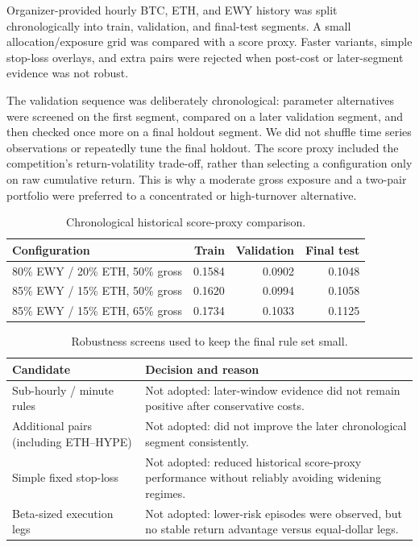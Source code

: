 \documentclass[a4paper,9pt]{article}
\begin{document}
Organizer-provided hourly BTC, ETH, and EWY history was split chronologically
into train, validation, and final-test segments. A small allocation/exposure
grid was compared with a score proxy. Faster variants, simple stop-loss
overlays, and extra pairs were rejected when post-cost or later-segment evidence
was not robust.

The validation sequence was deliberately chronological: parameter alternatives
were screened on the first segment, compared on a later validation segment, and
then checked once more on a final holdout segment. We did not shuffle time
series observations or repeatedly tune the final holdout. The score proxy
included the competition's return-volatility trade-off, rather than selecting a
configuration only on raw cumulative return. This is why a moderate gross
exposure and a two-pair portfolio were preferred to a concentrated or
high-turnover alternative.

\begin{table}[h]\centering\small
\caption{Chronological historical score-proxy comparison.}
\label{tab:allocation}
\begin{tabular}{lrrr}\toprule
Configuration & Train & Validation & Final test\\ \midrule
80\% EWY / 20\% ETH, 50\% gross & 0.1584 & 0.0902 & 0.1048\\
85\% EWY / 15\% ETH, 50\% gross & 0.1620 & 0.0994 & 0.1058\\
85\% EWY / 15\% ETH, 65\% gross & 0.1734 & 0.1033 & 0.1125\\ \bottomrule
\end{tabular}\end{table}

\begin{table}[h]\centering\small
\caption{Robustness screens used to keep the final rule set small.}
\begin{tabular}{p{3.2cm}p{5.7cm}}\toprule
Candidate & Decision and reason \\ \midrule
Sub-hourly / minute rules & Not adopted: later-window evidence did not remain positive after conservative costs. \\
Additional pairs (including ETH--HYPE) & Not adopted: did not improve the later chronological segment consistently. \\
Simple fixed stop-loss & Not adopted: reduced historical score-proxy performance without reliably avoiding widening regimes. \\
Beta-sized execution legs & Not adopted: lower-risk episodes were observed, but no stable return advantage versus equal-dollar legs. \\
\bottomrule\end{tabular}\end{table}
\end{document}
